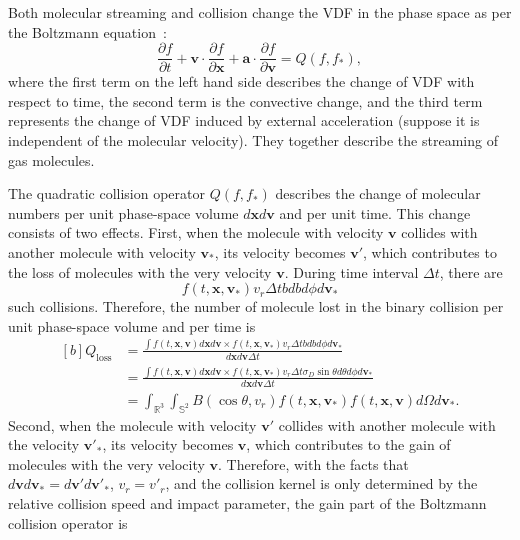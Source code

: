 Both molecular streaming and collision change the VDF in the phase space as per the Boltzmann equation~\cite{CE,Cercignani1990,henning,Kremer2009book}:
\begin{equation}\label{Boltzmann}
\frac{\partial f}{\partial t}+\bm{v}\cdot\frac{\partial f}{\partial
	\bm{x}}+\bm{a}\cdot\frac{\partial f}{\partial \bm{v}}={Q(f,f_*)},
\end{equation}
where the first term on the left hand side describes the change of VDF with respect to time, the second term is the convective change, and the third term represents the change of VDF induced by external acceleration (suppose it is independent of the molecular velocity). They together describe the streaming of gas molecules. 

The quadratic collision operator $Q(f,f_*)$ describes the change of molecular numbers per unit phase-space volume $d\bm{x}d\bm{v}$ and per unit time. This change consists of two effects. First, when the molecule with velocity $\bm{v}$ collides with another molecule with velocity $\bm{v}_\ast$, its velocity becomes $\bm{v}'$, which contributes to the loss of  molecules with the very velocity $\bm{v}$. During time interval $\Delta{t}$, there are 
\begin{equation}\label{total_collision}
f(t,\bm{x},\bm{v}_\ast)v_r\Delta{t}bdbd\phi{}d\bm{v}_\ast
\end{equation}
such collisions. Therefore, the number of molecule lost in the binary collision per unit phase-space volume and per time is
\begin{equation}
\begin{aligned}[b]
Q_{\text{loss}}&=\frac{\int{}f(t,\bm{x},\bm{v})d\bm{x}d\bm{v}\times
	f(t,\bm{x},\bm{v}_\ast)v_r\Delta{t}bdbd\phi{}d\bm{v}_\ast}{d\bm{x}d\bm{v}\Delta{t}}\\
&=\frac{\int{}f(t,\bm{x},\bm{v})d\bm{x}d\bm{v}\times
	f(t,\bm{x},\bm{v}_\ast)v_r\Delta{t}
	\sigma_D\sin\theta{d\theta}d\phi{}d\bm{v}_\ast}{d\bm{x}d\bm{v}\Delta{t}}\\
&=\int_{\mathbb{R}^3}\int_{\mathbb{S}^{2}}
B(\cos\theta,v_r)
f(t,\bm{x},\bm{v}_{\ast})f(t,\bm{x},\bm{v})
d\Omega
d\bm{v}_\ast.
\end{aligned}
\end{equation}
Second, when the molecule with velocity $\bm{v}'$ collides with another molecule with the velocity $\bm{v}'_\ast$, its velocity becomes $\bm{v}$, which contributes to the gain of molecules with the very velocity $\bm{v}$. Therefore, with the facts that $d\bm{v}d\bm{v}_\ast=d\bm{v}'d\bm{v}'_\ast$, $v_r=v'_r$, and the collision kernel is only determined by the relative collision speed and impact parameter, the gain part of the Boltzmann collision operator is
